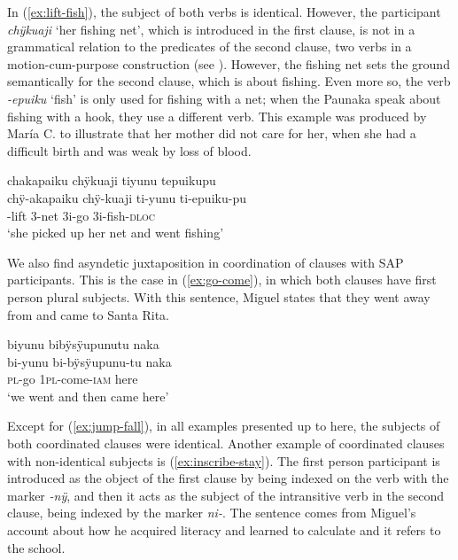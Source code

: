 In (\ref{ex:lift-fish}), the subject of both verbs is identical. However, the participant \textit{chÿkuaji} ‘her fishing net’, which is introduced in the first clause, is not in a grammatical relation to the predicates of the second clause, two verbs in a motion-cum-purpose construction (see ). However, the fishing net sets the ground semantically for the second clause, which is about fishing. Even more so, the verb \mbox{\textit{-epuiku}} ‘fish’ is only used for fishing with a net; when the Paunaka speak about fishing with a hook, they use a different verb. This example was produced by María C. to illustrate that her mother did not care for her, when she had a difficult birth and was weak by loss of blood.


\ea\label{ex:lift-fish}
\begingl
\glpreamble chakapaiku chÿkuaji tiyunu tepuikupu\\
\gla chÿ-akapaiku chÿ-kuaji ti-yunu ti-epuiku-pu\\
-lift 3-net 3i-go 3i-fish-\textsc{dloc}\\
\glft ‘she picked up her net and went fishing’
\endgl
\trailingcitation{[ump-p110815sf.433]}
\xe

We also find asyndetic juxtaposition in coordination of clauses with SAP participants. This is the case in (\ref{ex:go-come}), in which both clauses have first person plural subjects. With this sentence, Miguel states that they went away from  and came to Santa Rita.

\ea\label{ex:go-come}
\begingl
\glpreamble biyunu bibÿsÿupunutu naka\\
\gla bi-yunu bi-bÿsÿupunu-tu naka\\
\textsc{pl}-go 1\textsc{pl}-come-\textsc{iam} here\\
\glft ‘we went and then came here’
\endgl
\trailingcitation{[mqx-p110826l.380]}
\xe


Except for (\ref{ex:jump-fall}), in all examples presented up to here, the subjects of both coordinated clauses were identical. Another example of coordinated clauses with non-identical subjects is (\ref{ex:inscribe-stay}). The first person participant is introduced as the object of the first clause by being indexed on the verb with the marker \textit{-nÿ}, and then it acts as the subject of the intransitive verb in the second clause, being indexed by the marker \textit{ni-}. The sentence comes from Miguel’s account about how he acquired literacy and learned to calculate and it refers to the school.

